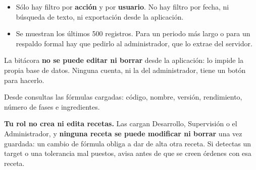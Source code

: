 
\begin{itemize}
    \item Sólo hay filtro por \textbf{acción} y por \textbf{usuario}. No hay filtro por
          fecha, ni búsqueda de texto, ni exportación desde la aplicación.
    \item Se muestran los últimos 500 registros. Para un periodo más largo o para un
          respaldo formal hay que pedirlo al administrador, que lo extrae del servidor.
\end{itemize}

\begin{cajaInfo}
La bitácora \textbf{no se puede editar ni borrar} desde la aplicación: lo impide la
propia base de datos. Ninguna cuenta, ni la del administrador, tiene un botón para
hacerlo.
\end{cajaInfo}

\newpage
{}

Desde  consultas las fórmulas cargadas: código, nombre, versión,
rendimiento, número de fases e ingredientes.


\vspace{6pt}

\textbf{Tu rol no crea ni edita recetas.} Las cargan Desarrollo, Supervisión o el
Administrador, y \textbf{ninguna receta se puede modificar ni borrar} una vez guardada:
un cambio de fórmula obliga a dar de alta otra receta. Si detectas un target o una
tolerancia mal puestos, avisa antes de que se creen órdenes con esa receta.

\newpage
{}

